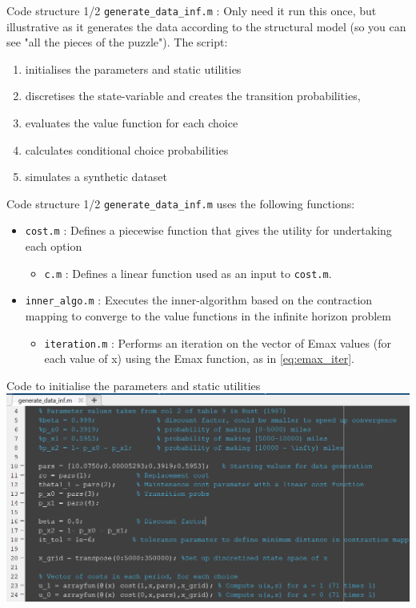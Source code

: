 \documentclass[aspectratio=169]{beamer}
\begin{document}
	\begin{frame}{Code structure 1/2}
		\texttt{generate\_data\_inf.m} : Only need it run this once, but illustrative as it generates the data according to the structural model (so you can see "all the pieces of the puzzle"). The script:
		\begin{enumerate}
			\itemsep1em
			\item initialises the parameters and static utilities
			\item discretises the state-variable and creates the transition probabilities,
			\item evaluates the value function for each choice
			\item calculates conditional choice probabilities
			\item simulates a synthetic dataset
		\end{enumerate}
	\end{frame}
	\begin{frame}{Code structure 1/2}
		\texttt{generate\_data\_inf.m} uses the following functions:
		\begin{itemize}
			\itemsep1em
			\item \texttt{cost.m} : Defines a piecewise function that gives the utility for undertaking each option
			\begin{itemize}
				\itemsep1em
				\item \texttt{c.m} : Defines a linear function used as an input to \texttt{cost.m}.
			\end{itemize}
			\item \texttt{inner\_algo.m} : Executes the inner-algorithm based on the contraction mapping to converge to the value functions in the infinite horizon problem
			\begin{itemize}
				\itemsep1em
				\item \texttt{iteration.m} : Performs an iteration on the vector of Emax values (for each value of x) using the Emax function, as in \ref{eq:emax_iter}.
			\end{itemize}
		\end{itemize}
	\end{frame}
	\begin{frame}{Code to initialise the parameters and static utilities}
		\includegraphics[width=\textwidth]{figs/1_setup.png}\end{frame}
	
\end{document}
